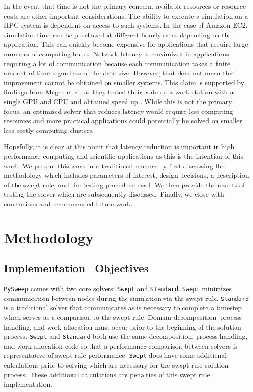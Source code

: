 \documentclass[review]{elsarticle}
\def\pysweep{\texttt{PySweep}}
\def\Swept{\texttt{Swept}}
\def\Standard{\texttt{Standard}}
\begin{document}
\par
In the event that time is not the primary concern, available resources or resource costs are other important considerations. The ability to execute a simulation on a HPC system is dependent on access to such systems. In the case of Amazon EC2, simulation time can be purchased at different hourly rates depending on the application. This can quickly become expensive for applications that require large numbers of computing hours. Network latency is maximized in applications requiring a lot of communication because each communication takes a finite amount of time regardless of the data size. However, that does not mean that improvement cannot be obtained on smaller systems. This claim is supported by findings from Magee et al. as they tested their code on a work station with a single GPU and CPU and obtained speed up \cite{Magee2018AcceleratingDecomposition}. While this is not the primary focus, an optimized solver that reduces latency would require less computing resources and more practical applications could potentially be solved on smaller less costly computing clusters.

\par
Hopefully, it is clear at this point that latency reduction is important in high performance computing and scientific applications as this is the intention of this work. We present this work in a traditional manner by first discussing the methodology which includes parameters of interest, design decisions, a description of the swept rule, and the testing procedure used. We then provide the results of testing the solver which are subsequently discussed. Finally, we close with conclusions and recommended future work.

%
%
\section{Methodology}
\label{methods-section}
\subsection{Implementation \ Objectives}
\pysweep{} comes with two core solvers: \Swept{} and \Standard{}. \Swept{} minimizes communication between nodes during the simulation via the swept rule. \Standard{} is a traditional solver that communicates as is necessary to complete a timestep which serves as a comparison to the swept rule. Domain decomposition, process handling, and work allocation must occur prior to the beginning of the solution process. \Swept{} and \Standard{} both use the same decomposition, process handling, and work allocation code so that a performance comparison between solvers is representative of swept rule performance. \Swept{} does have some additional calculations prior to solving which are necessary for the swept rule solution process. These additional calculations are penalties of this swept rule implementation. 
\end{document}

